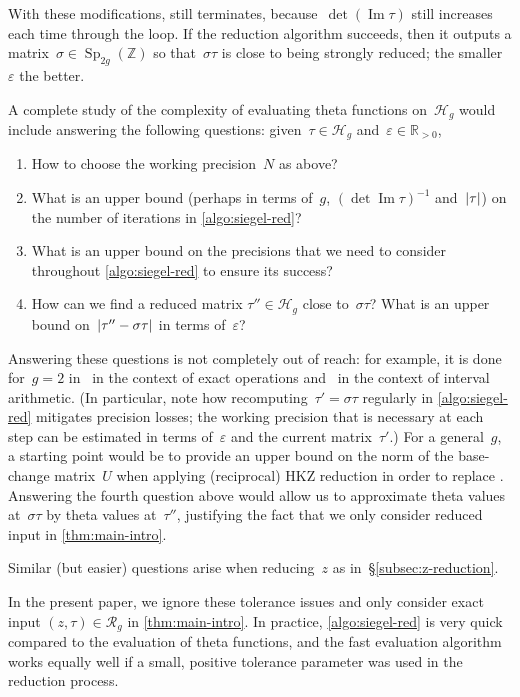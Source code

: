 \documentclass[12pt,oneside]{amsart}
\numberwithin{equation}{section}
\theoremstyle{definition}
\newcommand{\Z}{\mathbb{Z}}
\newcommand{\R}{\mathbb{R}}
\newcommand{\Half}{\mathcal{H}}
\newcommand{\eps}{\varepsilon}
\DeclareMathOperator{\im}{Im}
\DeclareMathOperator{\Sp}{Sp}
\DeclarePairedDelimiter{\abs}{|}{|}
\begin{document}
With these modifications,  still terminates,
because~$\det(\im\tau)$ still increases each time through the loop. If the
reduction algorithm succeeds, then it outputs a matrix~$\sigma\in \Sp_{2g}(\Z)$
so that~$\sigma\tau$ is close to being strongly reduced; the smaller~$\eps$ the
better.


A complete study of the complexity of evaluating theta functions on~$\Half_g$
would include answering the following questions: given~$\tau\in \Half_g$
and~$\eps \in\R_{>0}$,
\begin{enumerate}
\item How to choose the working
  precision~$N$ as above?
\item What is an upper bound (perhaps in terms of~$g$, $(\det \im\tau)^{-1}$
  and~$\abs{\tau}$) on the number of iterations in \cref{algo:siegel-red}?
\item What is an upper bound on the precisions that we need to consider
  throughout \cref{algo:siegel-red} to ensure its success?
\item How can we find a reduced matrix $\tau''\in \Half_g$ close
  to~$\sigma\tau$?  What is an upper bound on~$\abs{\tau'' - \sigma\tau}$ in
  terms of~$\eps$?
\end{enumerate}

Answering these questions is not completely out of reach: for example, it is
done for~$g=2$ in~\cite[§6.4]{strengComputingIgusaClass2014} in the context of
exact operations and~\cite{kiefferEvaluatingModularEquations2022} in the
context of interval arithmetic. (In particular, note how
recomputing~$\tau' = \sigma\tau$ regularly in \cref{algo:siegel-red} mitigates
precision losses; the working precision that is necessary at each step can be
estimated in terms of~$\eps$ and the current matrix~$\tau'$.) For a
general~$g$, a starting point would be to provide an upper bound on the norm of
the base-change matrix~$U$ when applying (reciprocal) HKZ reduction in order to
replace \cite[Lemma 6.6]{strengComputingIgusaClass2014}. Answering the fourth
question above would allow us to approximate theta values at~$\sigma\tau$ by
theta values at~$\tau''$, justifying the fact that we only consider reduced
input in \cref{thm:main-intro}.

Similar (but easier) questions arise when reducing~$z$ as
in~§\ref{subsec:z-reduction}.

In the present paper, we ignore these tolerance issues and only consider exact
input $(z,\tau)\in \mathcal{R}_g$ in \cref{thm:main-intro}. In practice,
\cref{algo:siegel-red} is very quick compared to the evaluation of theta
functions, and the fast evaluation algorithm works equally well if a small,
positive tolerance parameter was used in the reduction process.
\end{document}
